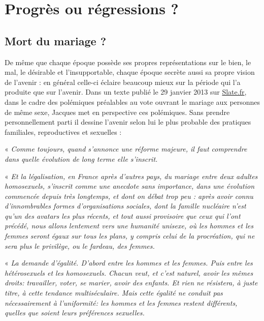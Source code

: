

\chapter{Progrès ou régressions ?}


 
 \section{Mort du mariage ?}
 
 
 
 
 De même que chaque époque possède ses propres représentations sur le bien, le mal, le désirable et l'insupportable, chaque époque secrète aussi sa propre vision de l'avenir : en général celle-ci éclaire beaucoup mieux sur la période qui l'a produite que sur l'avenir. Dans un texte publié le 29 janvier 2013 sur \href{http://www.slate.fr}{Slate.fr}, dans le cadre des polémiques préalables au vote ouvrant le mariage aux personnes de même sexe, Jacques  met en perspective ces polémiques. Sans prendre personnellement parti il dessine l'avenir selon lui le plus probable des pratiques familiales, reproductives et sexuelles : 
 
« \emph{Comme toujours, quand s'annonce une réforme majeure, il faut comprendre dans quelle évolution de long terme elle s'inscrit.}
 
« \emph{Et la légalisation, en France après d'autres pays, du mariage entre deux adultes homosexuels, s'inscrit comme une anecdote sans importance, dans une évolution commencée depuis très longtemps, et dont on débat trop peu : après avoir connu d'innombrables formes d'organisations sociales, dont la famille nucléaire n'est qu'un des avatars les plus récents, et tout aussi provisoire que ceux qui l'ont précédé, nous allons lentement vers une humanité unisexe, où les hommes et les femmes seront égaux sur tous les plans, y compris celui de la procréation, qui ne sera plus le privilège, ou le fardeau, des femmes.} 
 
« \emph{\primo La demande d'égalité. D'abord entre les hommes et les femmes. Puis entre les hétérosexuels et les homosexuels. Chacun veut, et c'est naturel, avoir les mêmes droits: travailler, voter, se marier, avoir des enfants. Et rien ne résistera, à juste titre, à cette tendance multiséculaire. Mais cette égalité ne conduit pas nécessairement à l'uniformité: les hommes et les femmes restent différents, quelles que soient leurs préférences sexuelles.}
 
